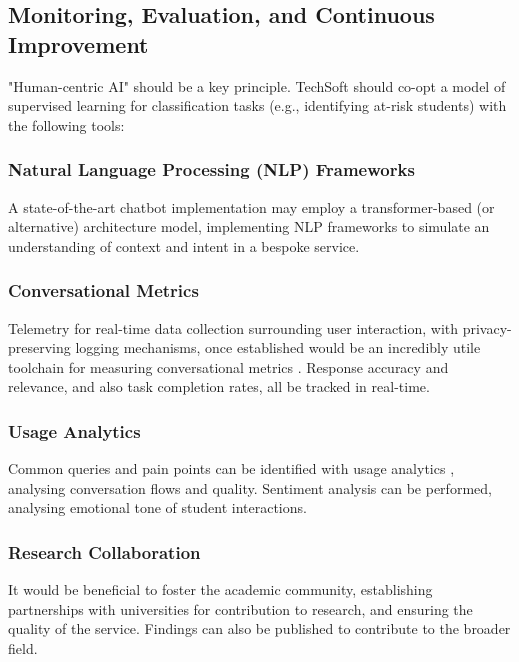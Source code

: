 \documentclass[14pt,a4paper]{article}
\begin{document}
\begin{multicols}{2}
\subsection{Monitoring, Evaluation, and Continuous Improvement}
 "Human-centric AI" should be a key principle.
 TechSoft should co-opt a model of supervised learning for classification tasks (e.g., identifying at-risk students) with the following tools:

\subsubsection{Natural Language Processing (NLP) Frameworks}
A state-of-the-art chatbot implementation may employ a transformer-based (or alternative) architecture model, implementing NLP frameworks \textit{\parencite[pp. 1-15]{JurafskyMartin2024}} to simulate an understanding of context and intent in a bespoke service.

\subsubsection{Conversational Metrics}
Telemetry \textit{\parencite[pp. 30-60]{Vadapalli2024}} for real-time data collection surrounding user interaction, with privacy-preserving logging mechanisms, once established would be an incredibly utile toolchain for measuring conversational metrics \textit{\parencite[pp. 1-32]{Quarteroni2024}}.
Response accuracy and relevance, and also task completion rates, all be tracked in real-time.


\subsubsection{Usage Analytics}
Common queries and pain points can be identified with usage analytics \textit{\parencite[pp. 50-100]{Beasley2024}}, analysing conversation flows and quality.
Sentiment analysis \textit{\parencite[pp. 50-100]{Liu2024}} can be performed, analysing emotional tone of student interactions.

\subsubsection{Research Collaboration}
    It would be beneficial to foster the academic community, establishing partnerships with universities \textit{\parencite[pp. 50-100]{Dillenbourg2024}} for contribution to research, and ensuring the quality of the service.
    Findings can also be published to contribute to the broader field.

\end{multicols}
\end{document}
